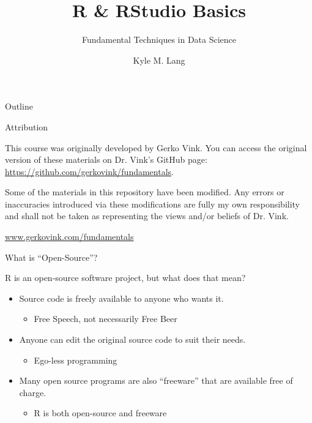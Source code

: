 \documentclass[10pt]{beamer}
\title{R \& RStudio Basics}
\subtitle{Fundamental Techniques in Data Science}
\author{Kyle M. Lang}
\institute{Department of Methodology \& Statistics\\Utrecht University}
\begin{document}
\begin{frame}[t, plain]
  \titlepage
\end{frame}


\begin{frame}{Outline}
  \tableofcontents
\end{frame}


\begin{frame}{Attribution}
  
This course was originally developed by Gerko Vink. You can access the original
version of these materials on Dr. Vink's GitHub page:
\url{https://github.com/gerkovink/fundamentals}.

Some of the materials in this repository have been modified. Any errors or
inaccuracies introduced via these modifications are fully my own responsibility
and shall not be taken as representing the views and/or beliefs of Dr. Vink.

\href{https://www.gerkovink.com/fundamentals}{www.gerkovink.com/fundamentals}

\end{frame}




\begin{frame}{What is ``Open-Source''?}

  R is an open-source software project, but what does that mean?
  \va
  \begin{itemize}
  \item Source code is freely available to anyone who wants it.
    \vb
    \begin{itemize}
    \item Free Speech, not necessarily Free Beer
    \end{itemize}
    \vb
  \item Anyone can edit the original source code to suit their needs.
    \vb
    \begin{itemize}
    \item Ego-less programming
    \end{itemize}
    \vb
  \item Many open source programs are also ``freeware'' that are available free
    of charge.
    \vb
    \begin{itemize}
    \item R is both open-source and freeware
    \end{itemize}
  \end{itemize}

\end{frame}
\end{document}
